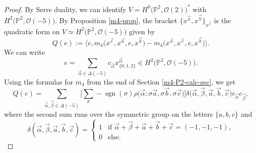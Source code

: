\documentclass[pdftex]{sigma}
\numberwithin{equation}{section}
\renewcommand{\P}{{\mathbb P}}
\newcommand{\OO}{{\mathcal O}}
\begin{document}
\begin{proof}
By Serre duality, we can identify $V=H^0\big(\P^2,\OO(2)\big)^*$ with $H^2\big(\P^2,\OO(-5)\big)$.
By Proposition \ref{m4-prop}, the bracket $\{x^{\vec{a}},x^{\vec{b}}\}_{x^{\vec{c}}}$ is the quadratic form on $V\simeq H^2\big(\P^2,\OO(-5)\big)$ given by
\[
Q(e):=\big\langle e,m_4\big(x^{\vec{c}},x^{\vec{a}},e,x^{\vec{b}}\big)-m_4\big(x^{\vec{a}},x^{\vec{c}},e,x^{\vec{b}}\big)\big\rangle.
\]
We can write
\[
e=\sum_{\vec{\alpha}\in \Delta(-5)}c_{\vec{\alpha}}x^{\vec{\alpha}}_{\{0,1,2\}}\in H^2\big(\P^2,\OO(-5)\big).
\]
Using the formulas for $m_4$ from the end of Section \ref{m4-P2-calc-sec},
we get
	\[
Q(e)=\sum_{\vec{\alpha},\vec{\beta}\in \Delta(-5)}\bigg[\sum_{\sigma}-\operatorname{sgn}(\sigma)\rho\big(\vec{\alpha};\sigma\vec{a},\sigma\vec{b},\sigma\vec{c}\big)\bigg]\delta\big(\vec{\alpha},\vec{\beta},\vec{a},\vec{b},\vec{c}\big)c_{\vec{\alpha}}c_{\vec{\beta}},
\]
	where the second sum runs over the symmetric group on the letters $\{a,b,c\}$ and
	\[
\delta(\vec{\alpha},\vec{\beta},\vec{a},\vec{b},\vec{c})=\begin{cases}
		1 & \text{if }\vec{\alpha}+\vec{\beta}+\vec{a}+\vec{b}+\vec{c}=(-1,-1,-1),\\
		0 & \text{else}.
	\end{cases}
\]


\end{proof}
\end{document}
